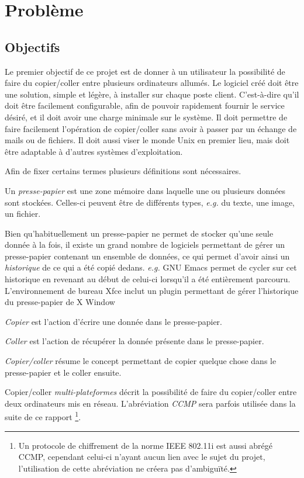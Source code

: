 \chapter{Problème}\label{ch:1}
\renewcommand{\leftmark}{\thechapter.~~Problème}
\section{Objectifs}
Le premier objectif de ce projet est de donner à un utilisateur la possibilité
de faire du copier/coller entre plusieurs ordinateurs allumés. Le logiciel
créé doit être une solution, simple et légère, à installer sur chaque
poste client. C'est-à-dire qu'il doit être facilement configurable, afin
de pouvoir rapidement fournir le service désiré, et il doit avoir
une charge minimale sur le système.
Il doit permettre de faire facilement l'opération de copier/coller
sans avoir à passer par un échange de mails ou de fichiers.
Il doit aussi viser le monde Unix en premier lieu, mais doit être adaptable
à d'autres systèmes d'exploitation.

Afin de fixer certains termes plusieurs définitions sont nécessaires.
\begin{defi}
  Un \emph{presse-papier} est une zone mémoire dans laquelle une ou
  plusieurs données sont stockées. Celles-ci peuvent être de différents types,
  \emph{e.g.} du texte, une image, un fichier.
\end{defi}
\begin{rem}
  Bien qu'habituellement un presse-papier ne permet de stocker qu'une seule
  donnée à la fois, il existe un grand nombre de logiciels permettant
  de gérer un presse-papier contenant un ensemble de données, ce qui permet
  d'avoir ainsi un \emph{historique} de ce qui a été copié dedans.
  \emph{e.g.} GNU Emacs \cite{emacs}
  permet de cycler sur cet historique en revenant au début de celui-ci
  lorsqu'il a été entièrement parcouru. L'environnement de bureau Xfce inclut
  un plugin permettant de gérer l'historique du presse-papier de X Window
  \cite{xfce-clipman}
\end{rem}
\begin{defi}
  \emph{Copier} est l'action d'écrire une donnée dans le presse-papier.
\end{defi}
\begin{defi}
  \emph{Coller} est l'action de récupérer la donnée présente dans le
  presse-papier.
\end{defi}
\begin{defi}
  \emph{Copier/coller} résume le concept permettant de copier
  quelque chose dans le presse-papier et le coller ensuite.
\end{defi}
\begin{defi}
  Copier/coller \emph{multi-plateformes} décrit la possibilité de faire
  du copier/coller entre deux ordinateurs mis en réseau. L'abréviation
  \emph{CCMP} sera parfois utilisée dans la suite de ce rapport
  \footnote{Un protocole de chiffrement de la norme IEEE 802.11i est
  aussi abrégé CCMP, cependant celui-ci n'ayant aucun lien avec le sujet
  du projet, l'utilisation de cette abréviation ne créera pas d'ambiguïté.}.
\end{defi}


